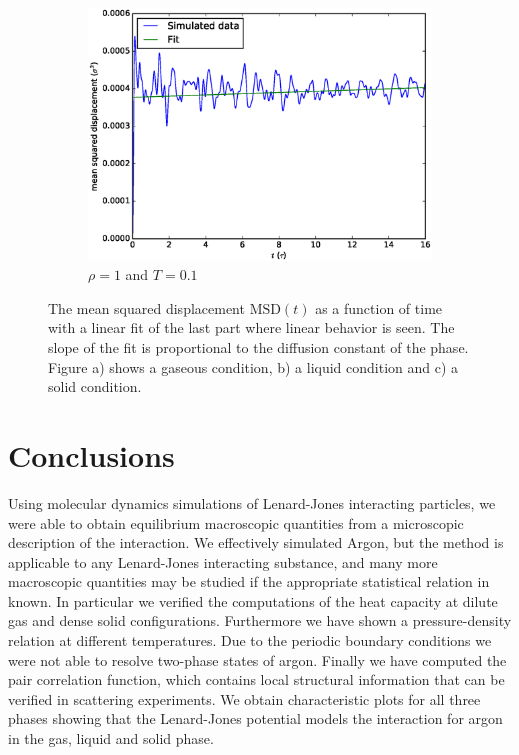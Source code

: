 \documentclass[twoside]{article}
\begin{document}
\begin{figure}[h]
\begin{subfigure}[b]{0.48\textwidth}
		\includegraphics[width=0.9\linewidth]{fig/figure_msd_solid.eps}
		\caption{$\rho = 1$ and $T = 0.1$}
		\label{fig:figure_msd_solid}
	\end{subfigure}
	\caption{The mean squared displacement $\mathrm{MSD}(t)$ as a function of time with a linear fit of the last part where linear behavior is seen. The slope of the fit is proportional to the diffusion constant of the phase. Figure a) shows a gaseous condition, b) a liquid condition and c) a solid condition.}
	\label{fig:figure_msd}
\end{figure}



	
\section{Conclusions}
Using molecular dynamics simulations of Lenard-Jones interacting particles, we were able to obtain equilibrium macroscopic quantities from a microscopic description of the interaction. We effectively simulated Argon, but the method is applicable to any Lenard-Jones interacting substance, and many more macroscopic quantities may be studied if the appropriate statistical relation in known. In particular we verified the computations of the heat capacity at dilute gas and dense solid configurations. Furthermore we have shown a pressure-density relation at different temperatures. Due to the periodic boundary conditions we were not able to resolve two-phase states of argon. Finally we have computed the pair correlation function, which contains local structural information that can be verified in scattering experiments. We obtain characteristic plots for all three phases showing that the Lenard-Jones potential models the interaction for argon in the gas, liquid and solid phase.
\end{document}
